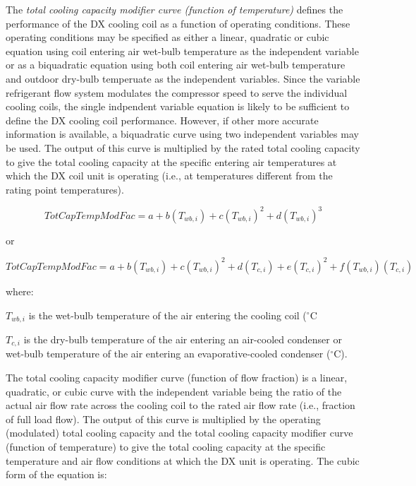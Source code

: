 The \emph{total cooling capacity modifier curve (function of temperature)} defines the performance of the DX cooling coil as a function of operating conditions. These operating conditions may be specified as either a linear, quadratic or cubic equation using coil entering air wet-bulb temperature as the independent variable or as a biquadratic equation using both coil entering air wet-bulb temperature and outdoor dry-bulb temperuate as the independent variables. Since the variable refrigerant flow system modulates the compressor speed to serve the individual cooling coils, the single indpendent variable equation is likely to be sufficient to define the DX cooling coil performance. However, if other more accurate information is available, a biquadratic curve using two independent variables may be used. The output of this curve is multiplied by the rated total cooling capacity to give the total cooling capacity at the specific entering air temperatures at which the DX coil unit is operating (i.e., at temperatures different from the rating point temperatures).

\begin{equation}
TotCapTempModFac = a + b\left( {{T_{wb,i}}} \right) + c{\left( {{T_{wb,i}}} \right)^2} + d{\left( {{T_{wb,i}}} \right)^3}
\end{equation}

or

\begin{equation}
TotCapTempModFac = a + b\left( {{T_{wb,i}}} \right) + c{\left( {{T_{wb,i}}} \right)^2} + d\left( {{T_{c,i}}} \right) + e{\left( {{T_{c,i}}} \right)^2} + f\left( {{T_{wb,i}}} \right)\left( {{T_{c,i}}} \right)
\end{equation}

where:

\({{T_{wb,i}}}\) is the wet-bulb temperature of the air entering the cooling coil (\(^{\circ}\)C

\({{T_{c,i}}}\) is the dry-bulb temperature of the air entering an air-cooled condenser or wet-bulb temperature of the air entering an evaporative-cooled condenser (\(^{\circ}\)C).

The total cooling capacity modifier curve (function of flow fraction) is a linear, quadratic, or cubic curve with the independent variable being the ratio of the actual air flow rate across the cooling coil to the rated air flow rate (i.e., fraction of full load flow). The output of this curve is multiplied by the operating (modulated) total cooling capacity and the total cooling capacity modifier curve (function of temperature) to give the total cooling capacity at the specific temperature and air flow conditions at which the DX unit is operating. The cubic form of the equation is:

